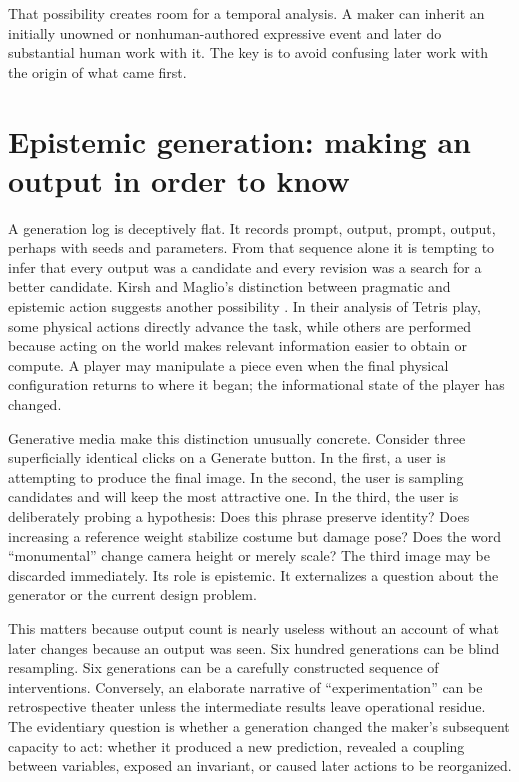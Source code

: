 \documentclass[11pt]{article}
\begin{document}
That possibility creates room for a temporal analysis. A maker can inherit an initially unowned or nonhuman-authored expressive event and later do substantial human work with it. The key is to avoid confusing later work with the origin of what came first.

\section{Epistemic generation: making an output in order to know}

A generation log is deceptively flat. It records prompt, output, prompt, output, perhaps with seeds and parameters. From that sequence alone it is tempting to infer that every output was a candidate and every revision was a search for a better candidate. Kirsh and Maglio's distinction between pragmatic and epistemic action suggests another possibility \citep{KirshMaglio1994Epistemic}. In their analysis of Tetris play, some physical actions directly advance the task, while others are performed because acting on the world makes relevant information easier to obtain or compute. A player may manipulate a piece even when the final physical configuration returns to where it began; the informational state of the player has changed.

Generative media make this distinction unusually concrete. Consider three superficially identical clicks on a Generate button. In the first, a user is attempting to produce the final image. In the second, the user is sampling candidates and will keep the most attractive one. In the third, the user is deliberately probing a hypothesis: Does this phrase preserve identity? Does increasing a reference weight stabilize costume but damage pose? Does the word ``monumental'' change camera height or merely scale? The third image may be discarded immediately. Its role is epistemic. It externalizes a question about the generator or the current design problem.

This matters because output count is nearly useless without an account of what later changes because an output was seen. Six hundred generations can be blind resampling. Six generations can be a carefully constructed sequence of interventions. Conversely, an elaborate narrative of ``experimentation'' can be retrospective theater unless the intermediate results leave operational residue. The evidentiary question is whether a generation changed the maker's subsequent capacity to act: whether it produced a new prediction, revealed a coupling between variables, exposed an invariant, or caused later actions to be reorganized.
\end{document}
